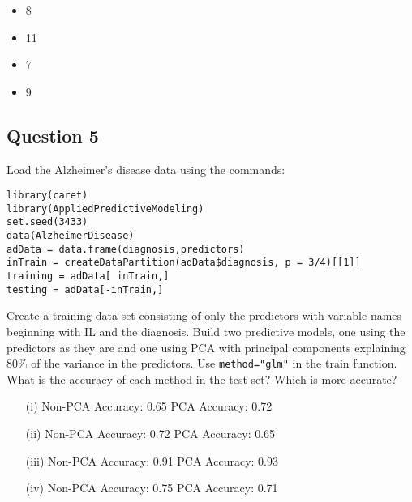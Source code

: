 \documentclass[DSS8main.tex]{subfiles}
\begin{document}
\begin{itemize}
\item 8
\item 11
\item 7
\item 9
\end{itemize}
\newpage
\subsection*{Question 5}
Load the Alzheimer's disease data using the commands:
\begin{framed}
\begin{verbatim}
library(caret)
library(AppliedPredictiveModeling)
set.seed(3433)
data(AlzheimerDisease)
adData = data.frame(diagnosis,predictors)
inTrain = createDataPartition(adData$diagnosis, p = 3/4)[[1]]
training = adData[ inTrain,]
testing = adData[-inTrain,]
\end{verbatim}
\end{framed}
Create a training data set consisting of only the predictors with variable names beginning with IL and the diagnosis. Build two predictive models, one using the predictors as they are and one using PCA with principal components explaining 80\% of the variance in the predictors. Use \texttt{method="glm"} in the train function. 
\\
What is the accuracy of each method in the test set? Which is more accurate?\\
\begin{itemize}
\item[(i)] Non-PCA Accuracy: 0.65 
PCA Accuracy: 0.72
\item[(ii)]  Non-PCA Accuracy: 0.72 
PCA Accuracy: 0.65
\item[(iii)]  Non-PCA Accuracy: 0.91 
PCA Accuracy: 0.93
\item[(iv)]  Non-PCA Accuracy: 0.75 
PCA Accuracy: 0.71
\end{itemize}
\end{document}
